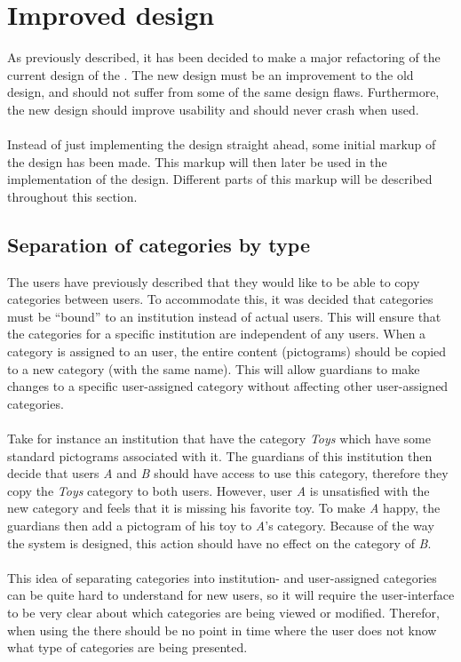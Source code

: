 \section{Improved design}
\label{sec:improved_design}

As previously described, it has been decided to make a major refactoring of the current design of the \ct. The new design must be an improvement to the old design, and should not suffer from some of the same design flaws. Furthermore, the new design should improve usability and should never crash when used.
\\\\
Instead of just implementing the design straight ahead, some initial markup of the design has been made. This markup will then later be used in the implementation of the design. Different parts of this markup will be described throughout this section.

\subsection{Separation of categories by type}
The users have previously described that they would like to be able to copy categories between users. To accommodate this, it was decided that categories must  be ``bound'' to an institution instead of actual users. This will ensure that the categories for a specific institution are independent of any users. When a category is assigned to an user, the entire content (pictograms) should be copied to a new category (with the same name). This will allow guardians to make changes to a specific user-assigned category without affecting other user-assigned categories. 
\\\\
Take for instance an institution that have the category \emph{Toys} which have some standard pictograms associated with it. The guardians of this institution then decide that users \emph{A} and \emph{B} should have access to use this category, therefore they copy the \emph{Toys} category to both users. However, user \emph{A} is unsatisfied with the new category and feels that it is missing his favorite toy. To make \emph{A} happy, the guardians then add a pictogram of his toy to \emph{A}'s category. Because of the way the system is designed, this action should have no effect on the category of \emph{B}.
\\\\
This idea of separating categories into institution- and user-assigned categories can be quite hard to understand for new users, so it will require the user-interface to be very clear about which categories are being viewed or modified. Therefor, when using the \ct there should be no point in time where the user does not know what type of categories are being presented. 

